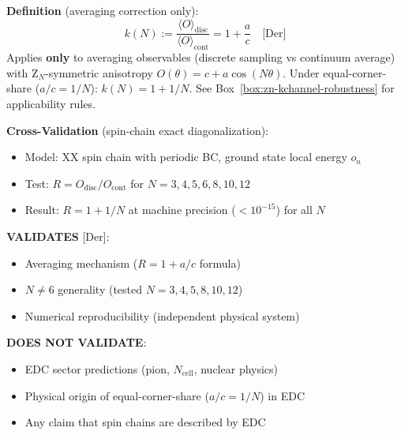 %

\begin{tcolorbox}[colback=cyan!5!white, colframe=cyan!50!black,
                  title=\textbf{k-channel Cross-Validation (Independent Analog Test)}]
\label{box:kchannel-spinchain-xval}

\textbf{Definition} (averaging correction only):
\begin{equation}
k(N) := \frac{\langle O \rangle_{\text{disc}}}{\langle O \rangle_{\text{cont}}}
= 1 + \frac{a}{c} \quad \text{[Der]}
\end{equation}
Applies \textbf{only} to averaging observables (discrete sampling vs continuum average)
with Z$_N$-symmetric anisotropy $O(\theta) = c + a\cos(N\theta)$.
Under equal-corner-share ($a/c = 1/N$): $k(N) = 1 + 1/N$.
See Box~\ref{box:zn-kchannel-robustness} for applicability rules.

\vspace{0.3em}
\textbf{Cross-Validation} (spin-chain exact diagonalization):
\begin{itemize}[nosep,leftmargin=1.5em]
\item Model: XX spin chain with periodic BC, ground state local energy $o_n$
\item Test: $R = O_{\text{disc}}/O_{\text{cont}}$ for $N = 3, 4, 5, 6, 8, 10, 12$
\item Result: $R = 1 + 1/N$ at machine precision ($<10^{-15}$) for all $N$
\end{itemize}

\vspace{0.3em}
\textbf{VALIDATES} [Der]:
\begin{itemize}[nosep,leftmargin=1.5em]
\item[\checkmark] Averaging mechanism ($R = 1 + a/c$ formula)
\item[\checkmark] $N \ne 6$ generality (tested $N = 3, 4, 5, 8, 10, 12$)
\item[\checkmark] Numerical reproducibility (independent physical system)
\end{itemize}

\vspace{0.3em}
\textbf{DOES NOT VALIDATE}:
\begin{itemize}[nosep,leftmargin=1.5em]
\item[$\times$] EDC sector predictions (pion, $N_{\text{cell}}$, nuclear physics)
\item[$\times$] Physical origin of equal-corner-share ($a/c = 1/N$) in EDC
\item[$\times$] Any claim that spin chains are described by EDC
\end{itemize}


\end{tcolorbox}
